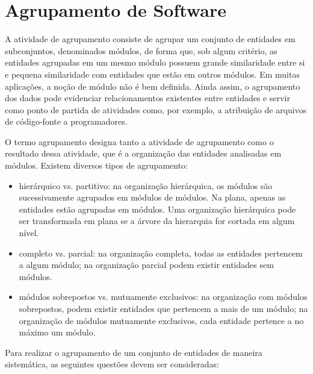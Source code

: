 %
% 

\chapter{Agrupamento de Software}

A atividade de agrupamento consiste de agrupar um conjunto de entidades em subconjuntos, denominados módulos, de forma que, sob algum critério, as entidades agrupadas em um mesmo módulo possuem grande similaridade entre si e pequena similaridade com entidades que estão em outros módulos. Em muitas aplicações, a noção de módulo não é bem definida. Ainda assim, o agrupamento dos dados pode evidenciar relacionamentos existentes entre entidades e servir como ponto de partida de atividades como, por exemplo, a atribuição de arquivos de código-fonte a programadores.

O termo agrupamento designa tanto a atividade de agrupamento como o resultado dessa atividade, que é a organização das entidades analisadas em módulos. Existem diversos tipos de agrupamento:

\begin{itemize}
	\item hierárquico vs. partitivo: na organização hierárquica, os módulos são sucessivamente agrupados em módulos de módulos. Na plana, apenas as entidades estão agrupadas em módulos. Uma organização hierárquica pode ser transformada em plana se a árvore da hierarquia for cortada em algum nível.

	\item completo vs. parcial: na organização completa, todas as entidades pertencem a algum módulo; na organização parcial podem existir entidades sem módulos.

	\item módulos sobrepostos vs. mutuamente exclusivos: na organização com módulos sobrepostos, podem existir entidades que pertencem a mais de um módulo; na organização de módulos mutuamente exclusivos, cada entidade pertence a no máximo um módulo.
\end{itemize}


Para realizar o agrupamento de um conjunto de entidades de maneira sistemática, as seguintes questões devem ser consideradas:

